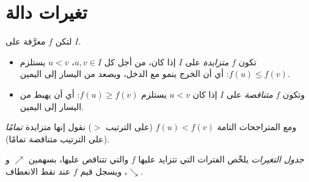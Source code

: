 \section{تغيرات دالة}

\begin{definition}\label{def:g10:functions:variations}
لتكن $f$ معرَّفة على  $I$.
\begin{itemize}
  \item تكون $f$ \emph{متزايدة} على $I$ إذا كان،
        من أجل كل $u, v \in I$، $u < v$ يستلزم $f(u) \leq f(v)$: أي أن
        الخرج ينمو مع الدخل، ويصعد  من اليسار إلى
        اليمين.
  \item وتكون $f$ \emph{متناقصة} على $I$ إذا كان
        $u < v$ يستلزم $f(u) \geq f(v)$: أي أن  يهبط من اليسار إلى
        اليمين.
\end{itemize}
ومع المتراجحات التامة $f(u) < f(v)$ (على الترتيب $>$) نقول إنها
متزايدة \emph{تمامًا} (على الترتيب متناقصة تمامًا).
\end{definition}

\begin{definition}\label{def:g10:functions:table}
\emph{جدول التغيرات} يلخّص الفترات التي تتزايد
عليها $f$ والتي تتناقص عليها، بسهمين $\nearrow$ و
$\searrow$، ويسجل قيم $f$ عند نقط الانعطاف.
\end{definition}

